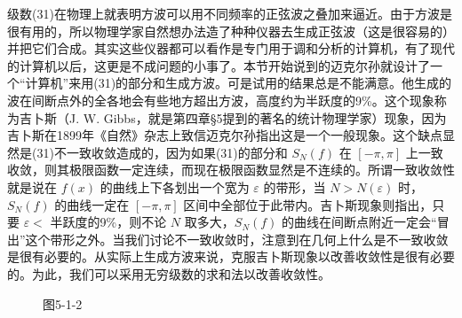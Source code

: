 级数(31)在物理上就表明方波可以用不同频率的正弦波之叠加来逼近。由于方波是很有用的，所以物理学家自然想办法造了种种仪器去生成正弦波（这是很容易的）并把它们合成。其实这些仪器都可以看作是专门用于调和分析的计算机，有了现代的计算机以后，这更是不成问题的小事了。本节开始说到的迈克尔孙就设计了一个“计算机”来用(31)的部分和生成方波。可是试用的结果总是不能满意。他生成的波在间断点外的全各地会有些地方超出方波，高度约为半跃度的9\%。这个现象称为吉卜斯（J. W. Gibbs，就是第四章\S5提到的著名的统计物理学家）现象，因为吉卜斯在1899年《自然》杂志上致信迈克尔孙指出这是一个一般现象。这个缺点显然是(31)不一致收敛造成的，因为如果(31)的部分和 $S_N(f)$ 在 $[-\pi,\pi]$ 上一致收敛，则其极限函数一定连续，而现在极限函数显然是不连续的。所谓一致收敛性就是说在 $f(x)$ 的曲线上下各划出一个宽为 $\varepsilon$ 的带形，当 $N>N(\varepsilon)$ 时，$S_N(f)$ 的曲线一定在 $[-\pi,\pi]$ 区间中全部位于此带内。吉卜斯现象则指出，只要 $\varepsilon<$ 半跃度的9\%，则不论 $N$ 取多大，$S_N(f)$ 的曲线在间断点附近一定会“冒出”这个带形之外。当我们讨论不一致收敛时，注意到在几何上什么是不一致收敛是很有必要的。从实际上生成方波来说，克服吉卜斯现象以改善收敛性是很有必要的。为此，我们可以采用无穷级数的求和法以改善收敛性。

\begin{figure}[htbp]
\centering
{}
\caption*{图5-1-2}
\end{figure}

